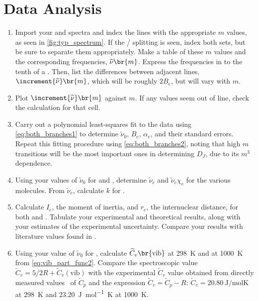 

\section{Data Analysis} %
\label{sec:data_analysis}

\begin{enumerate}
	\item Import your  and  spectra and index the lines with the appropriate \( m \) values, as seen in \cref{fig:typ_spectrum}. 
	If the / splitting is seen, index both sets, but be sure to separate them appropriately.
	Make a table of these \( m \) values and the corresponding frequencies, \( \widetilde{\nu}\br{m} \). 
	Express the frequencies in \unit{\wn} to the tenth of a \unit{\wn}. 
	Then, list the differences between adjacent lines, \( \increment{\widetilde{\nu}}\br{m} \), which will be roughly \( 2 B_e \), but will vary with \( m \). 
	\item Plot \( \increment{\widetilde{\nu}}\br{m} \) against \( m \).
	If any values seem out of line, check the calculation for that cell. 
	\item Carry out a polynomial least-squares fit to the data using \cref{eq:both_branches1} to determine \( \widetilde{\nu}_0 \), \( B_e \), \( \alpha_e \), and their standard errors. 
	Repeat this fitting procedure using \cref{eq:both_branches2}, noting that high \( m \) transitions will be the most important ones in determining \( D_J \), due to its \( m^3 \) dependence. 
	\item Using your values of \( \widetilde{\nu}_0 \) for  and , determine \( \widetilde{\nu}_e \) and \( \widetilde{\nu}_e \chi_e \) for the various molecules. From \( \widetilde{\nu}_e \), calculate \( k \) for . 
	\item Calculate \( I_e \), the moment of inertia, and \( r_e \), the internuclear distance, for both  and . 
	Tabulate your experimental and theoretical results, along with your estimates  of the experimental uncertainty. 
	Compare your results with literature values found in \textcite{kerr82}. 
	\item Using your value of \( \widetilde{\nu}_0 \) for , calculate \( \widetilde{C}_v\br{\text{vib}} \) at \qty{298}{\K} and at \qty{1000}{\K} from \cref{eq:vib_part_func2}. 
	Compare the spectroscopic value \( \widetilde{C}_v = 5/2 R + \widetilde{C}_v(\text{vib}) \) with the experimental \( \widetilde{C}_v \) value obtained from directly measured values~\autocite{lewis61,spencer48} of \( \widetilde{C}_p \) and the expression \( \widetilde{C}_v = \widetilde{C}_p - R \): \( \widetilde{C}_v = \qty{20.80}{\J \per \mole\K} \) at \qty{298}{K} and \qty{23.20}{\J \per \mol\K} at \qty{1000}{\K}. 
\end{enumerate}

